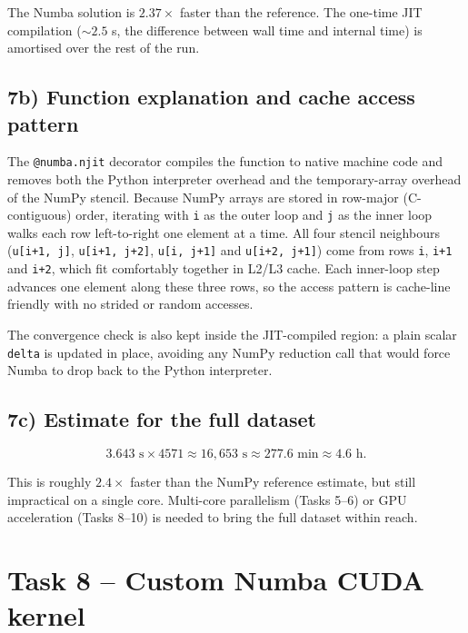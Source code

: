 \documentclass[11pt,a4paper]{article}
\begin{document}
The Numba solution is \(2.37\times\) faster than the reference. The one-time
JIT compilation (\(\sim\!2.5\) s, the difference between wall time and internal
time) is amortised over the rest of the run.

\subsection*{7b) Function explanation and cache access pattern}

The \texttt{@numba.njit} decorator compiles the function to native machine code
and removes both the Python interpreter overhead and the temporary-array
overhead of the NumPy stencil. Because NumPy arrays are stored in row-major
(C-contiguous) order, iterating with \texttt{i} as the outer loop and \texttt{j}
as the inner loop walks each row left-to-right one element at a time. All four
stencil neighbours (\texttt{u[i+1, j]}, \texttt{u[i+1, j+2]}, \texttt{u[i, j+1]}
and \texttt{u[i+2, j+1]}) come from rows \texttt{i}, \texttt{i+1} and
\texttt{i+2}, which fit comfortably together in L2/L3 cache. Each inner-loop
step advances one element along these three rows, so the access pattern is
cache-line friendly with no strided or random accesses.

The convergence check is also kept inside the JIT-compiled region: a plain
scalar \texttt{delta} is updated in place, avoiding any NumPy reduction call
that would force Numba to drop back to the Python interpreter.

\subsection*{7c) Estimate for the full dataset}

\[
    3.643 \text{ s} \times 4571 \approx 16{,}653 \text{ s} \approx 277.6 \text{ min} \approx 4.6 \text{ h}.
\]

This is roughly \(2.4\times\) faster than the NumPy reference estimate, but
still impractical on a single core. Multi-core parallelism (Tasks 5--6) or GPU
acceleration (Tasks 8--10) is needed to bring the full dataset within reach.

\section{Task 8 -- Custom Numba CUDA kernel}
\end{document}

